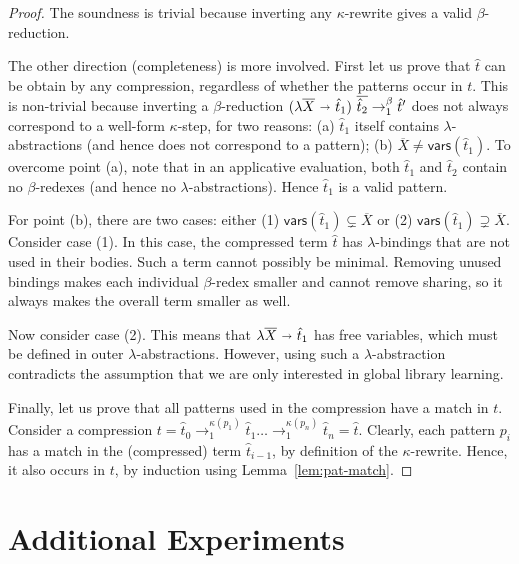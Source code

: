 \documentclass[acmsmall,screen,nonacm,review=false,timestamp=false]{acmart}
\newcommand{\many}[1]{\overline{#1}}
\newcommand{\fv}{\mathsf{vars}}
\newcommand{\bnd}{\ \mathbf{\shortrightarrow}\ }
\newcommand{\rwsteps}[1]{\rightarrow^{#1}_1}
\newcommand{\betared}{\rwsteps{\beta}}
\begin{document}
\begin{proof}
The soundness is trivial because inverting any $\kappa$-rewrite gives a valid $\beta$-reduction.

The other direction (completeness) is more involved.
First let us prove that $\hat{t}$ can be obtain by any compression, regardless of whether the patterns occur in $t$.
This is non-trivial
because inverting a $\beta$-reduction $(\lambda \many{X} \bnd \hat{t}_1)\ \many{\hat{t}_2}  \betared  \hat{t}'$
does not always correspond to a well-form $\kappa$-step,
for two reasons:
(a) $\hat{t}_1$ itself contains $\lambda$-abstractions (and hence does not correspond to a pattern);
(b) $\many{X} \neq \fv(\hat{t}_1)$.
To overcome point (a), note that in an applicative evaluation,
both $\hat{t}_1$ and $\hat{t}_2$ contain no $\beta$-redexes (and hence no $\lambda$-abstractions).
Hence  $\hat{t}_1$ is a valid pattern.

For point (b), there are two cases: either (1) $\fv(\hat{t}_1) \subsetneq \many{X}$
or (2) $\fv(\hat{t}_1) \supsetneq \many{X}$.
Consider case (1).
In this case, the compressed term $\hat{t}$ has $\lambda$-bindings that are not used in their bodies.
Such a term cannot possibly be minimal.
Removing unused bindings makes each individual $\beta$-redex smaller and cannot remove sharing,
so it always makes the overall term smaller as well.

Now consider case (2).
This means that $\lambda \many{X} \bnd \hat{t}_1$ has free variables, 
which must be defined in outer $\lambda$-abstractions.
However, using such a $\lambda$-abstraction contradicts the assumption that we are only interested in global library learning.

Finally, let us prove that all patterns used in the compression have a match in $t$.
Consider a compression $t = \hat{t}_0 \rwsteps{\kappa(p_1)} \hat{t}_1 \dots \rwsteps{\kappa(p_n)}  \hat{t}_n = \hat{t}$.
Clearly, each pattern $p_i$ has a match in the (compressed) term $\hat{t}_{i-1}$, by definition of the $\kappa$-rewrite.
Hence, it also occurs in $t$, by induction using Lemma~\ref{lem:pat-match}.
\end{proof}



\newpage
\section{Additional Experiments}\label{app:eval}
\end{document}
